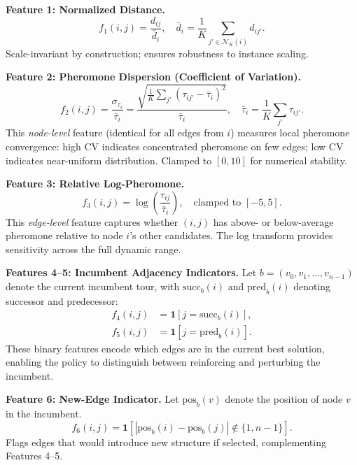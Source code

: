 \documentclass[sigconf,review]{acmart}
\begin{document}
\textbf{Feature 1: Normalized Distance.}
\begin{equation}
f_1(i,j) = \frac{d_{ij}}{\bar{d}_i}, \quad \bar{d}_i = \frac{1}{K} \sum_{j' \in \mathcal{N}_K(i)} d_{ij'}.
\end{equation}
Scale-invariant by construction; ensures robustness to instance scaling.

\textbf{Feature 2: Pheromone Dispersion (Coefficient of Variation).}
\begin{equation}
f_2(i,j) = \frac{\sigma_{\tau_i}}{\bar{\tau}_i} = \frac{\sqrt{\frac{1}{K}\sum_{j'} (\tau_{ij'} - \bar{\tau}_i)^2}}{\bar{\tau}_i}, \quad \bar{\tau}_i = \frac{1}{K}\sum_{j'} \tau_{ij'}.
\end{equation}
This \emph{node-level} feature (identical for all edges from $i$) measures local pheromone convergence: high CV indicates concentrated pheromone on few edges; low CV indicates near-uniform distribution.
Clamped to $[0, 10]$ for numerical stability.

\textbf{Feature 3: Relative Log-Pheromone.}
\begin{equation}
f_3(i,j) = \log\!\left(\frac{\tau_{ij}}{\bar{\tau}_i}\right), \quad \text{clamped to } [-5, 5].
\end{equation}
This \emph{edge-level} feature captures whether $(i,j)$ has above- or below-average pheromone relative to node $i$'s other candidates.
The log transform provides sensitivity across the full dynamic range.

\textbf{Features 4--5: Incumbent Adjacency Indicators.}
Let $b = (v_0, v_1, \ldots, v_{n-1})$ denote the current incumbent tour, with $\mathrm{succ}_b(i)$ and $\mathrm{pred}_b(i)$ denoting successor and predecessor:
\begin{align}
f_4(i,j) &= \mathbf{1}[j = \mathrm{succ}_b(i)], \\
f_5(i,j) &= \mathbf{1}[j = \mathrm{pred}_b(i)].
\end{align}
These binary features encode which edges are in the current best solution, enabling the policy to distinguish between reinforcing and perturbing the incumbent.

\textbf{Feature 6: New-Edge Indicator.}
Let $\mathrm{pos}_b(v)$ denote the position of node $v$ in the incumbent.
\begin{equation}
f_6(i,j) = \mathbf{1}\!\left[|\mathrm{pos}_b(i) - \mathrm{pos}_b(j)| \notin \{1, n{-}1\}\right].
\end{equation}
Flags edges that would introduce new structure if selected, complementing Features 4--5.
\end{document}
